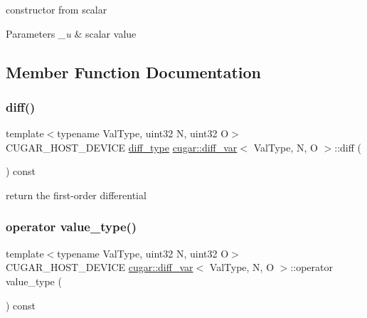 constructor from scalar


\begin{DoxyParams}{Parameters}
{\em \+\_\+u} & scalar value \\
\hline
\end{DoxyParams}


\subsection{Member Function Documentation}
\mbox{\label{structcugar_1_1diff__var_a5b4aa7e26e75bc03041ac1e15c81e960}} 
\subsubsection{\texorpdfstring{diff()}{diff()}}
{\footnotesize\ttfamily template$<$typename Val\+Type, uint32 N, uint32 O$>$ \\
C\+U\+G\+A\+R\+\_\+\+H\+O\+S\+T\+\_\+\+D\+E\+V\+I\+CE \hyperlink{structcugar_1_1_vector}{diff\+\_\+type} \hyperlink{structcugar_1_1diff__var}{cugar\+::diff\+\_\+var}$<$ Val\+Type, N, O $>$\+::diff (\begin{DoxyParamCaption}{ }\end{DoxyParamCaption}) const\hspace{0.3cm}{\ttfamily [inline]}}

return the first-\/order differential \mbox{\label{structcugar_1_1diff__var_a073bb39f8d7563a648e4fc8fc4056035}} 
\subsubsection{\texorpdfstring{operator value\+\_\+type()}{operator value\_type()}}
{\footnotesize\ttfamily template$<$typename Val\+Type, uint32 N, uint32 O$>$ \\
C\+U\+G\+A\+R\+\_\+\+H\+O\+S\+T\+\_\+\+D\+E\+V\+I\+CE \hyperlink{structcugar_1_1diff__var}{cugar\+::diff\+\_\+var}$<$ Val\+Type, N, O $>$\+::operator value\+\_\+type (\begin{DoxyParamCaption}{ }\end{DoxyParamCaption}) const\hspace{0.3cm}{\ttfamily [inline]}}

